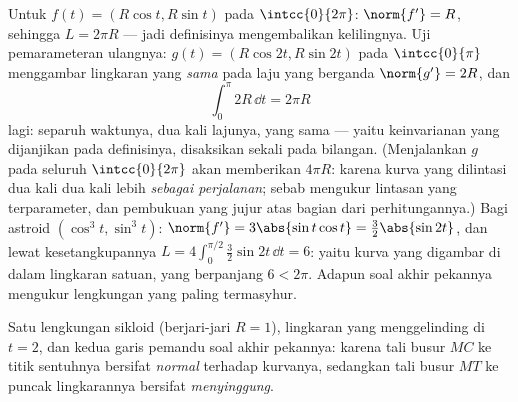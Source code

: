 \begin{example}\label{ex:b1:curves:circlelength}
Untuk $f(t) = (R\cos t, R\sin t)$ pada $\intcc{0}{2\pi}$: $\norm{f'} =
R$, sehingga $L = 2\pi R$ --- jadi definisinya mengembalikan kelilingnya.
Uji pemarameteran ulangnya:  $g(t) = (R\cos 2t, R\sin 2t)$ pada
$\intcc{0}{\pi}$ menggambar lingkaran yang \emph{sama} pada laju yang berganda
$\norm{g'} = 2R$, dan
\[
\int_0^{\pi} 2R\,\dd t = 2\pi R
\]
lagi: separuh waktunya, dua kali lajunya,  yang sama --- yaitu
keinvarianan yang dijanjikan pada definisinya, disaksikan sekali pada bilangan.
(Menjalankan $g$ pada seluruh $\intcc{0}{2\pi}$ akan memberikan $4\pi R$: karena
kurva yang dilintasi dua kali dua kali lebih  \emph{sebagai perjalanan};
sebab  mengukur lintasan yang terparameter, dan pembukuan yang jujur atas
 bagian dari perhitungannya.)
Bagi astroid $(\cos^3t, \sin^3t)$: $\norm{f'} = 3\abs{\sin
t\cos t} = \tfrac32\abs{\sin 2t}$, dan lewat kesetangkupannya $L = 4\int_0^{\pi/2}
\tfrac32\sin 2t\,\dd t = 6$: yaitu kurva yang digambar di dalam lingkaran satuan,
yang berpanjang $6 < 2\pi$. Adapun soal akhir pekannya mengukur lengkungan
yang paling termasyhur.
\end{example}

\begin{omfigure}

{\small Satu lengkungan sikloid (berjari-jari $R = 1$), lingkaran
yang menggelinding di $t = 2$, dan kedua garis pemandu soal akhir pekannya:
karena tali busur $MC$ ke titik sentuhnya bersifat \emph{normal} terhadap
kurvanya, sedangkan tali busur $MT$ ke puncak lingkarannya bersifat \emph{menyinggung}.}
\end{omfigure}

